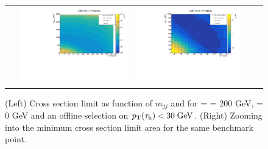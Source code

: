 \begin{figure}[tbh!]
	\centering
	\begin{tabular}{cc}
		\includegraphics[width=0.45\textwidth]{analysis/pics/JetInvMass_vs_MET_xsec_chi200_lsp000_taupt30.pdf}
		\includegraphics[width=0.45\textwidth]{analysis/pics/JetInvMass_vs_MET_xsec_chi200_lsp000_taupt30_zoom.pdf} 		
	\end{tabular}
	\caption{(Left) Cross section limit as function of $m_{jj}$ and \met for \charginopm = \neutralinotwo = 200 GeV, \neutralinoone = 0 GeV and an offline selection on $p_{\text{T}}(\tau_{\text{h}}) <  30\;\text{Ge}\kern-0.06667em\text{V}$. (Right) Zooming into the minimum cross section limit area for the same benchmark point.}
	\label{fig::JetInvMass_vs_MET_xsec_chi200_lsp000_taupt30}
\end{figure}

